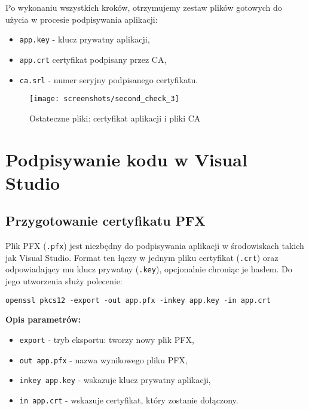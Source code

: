 \documentclass{article}
\begin{document}
Po wykonaniu wszystkich kroków, otrzymujemy zestaw plików gotowych do użycia w procesie podpisywania aplikacji:

\begin{itemize}
    \item \texttt{app.key} - klucz prywatny aplikacji,
    \item \texttt{app.crt}  certyfikat podpisany przez CA,
    \item \texttt{ca.srl} - numer seryjny podpisanego certyfikatu.
\end{itemize}

\begin{figure}[H]
    \centering
    \texttt{[image: screenshots/second\_check\_3]}
    \caption{Ostateczne pliki: certyfikat aplikacji i pliki CA}
    \label{fig:final_files}
\end{figure}

{\baselineskip}

\section{Podpisywanie kodu w Visual Studio}

\subsection{Przygotowanie certyfikatu PFX}
Plik PFX (\texttt{.pfx}) jest niezbędny do podpisywania aplikacji w środowiskach takich jak Visual Studio. Format ten łączy w jednym pliku certyfikat (\texttt{.crt}) oraz odpowiadający mu klucz prywatny (\texttt{.key}), opcjonalnie chroniąc je hasłem. Do jego utworzenia służy polecenie:

\begin{lstlisting}[style=command, caption=Generowanie PFX]
openssl pkcs12 -export -out app.pfx -inkey app.key -in app.crt
\end{lstlisting}

\noindent\textbf{Opis parametrów:}
\begin{itemize}
    \item \texttt{export} - tryb eksportu: tworzy nowy plik PFX,
    \item \texttt{out app.pfx} - nazwa wynikowego pliku PFX,
    \item \texttt{inkey app.key} - wskazuje klucz prywatny aplikacji,
    \item \texttt{in app.crt} - wskazuje certyfikat, który zostanie dołączony.
\end{itemize}
\end{document}
